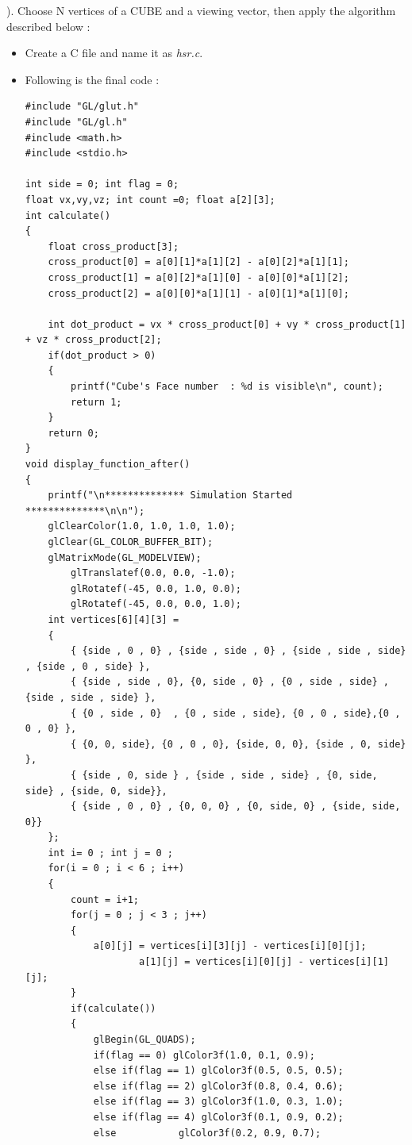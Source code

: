\vspace{0.5mm} ). Choose N vertices of a CUBE and a viewing vector, then apply the algorithm  described below :
\begin{itemize}
\item Create a C file and name it as \textit{hsr.c}.
\item Following is the final code :
\begin{lstlisting}
#include "GL/glut.h"
#include "GL/gl.h"
#include <math.h>
#include <stdio.h>

int side = 0; int flag = 0;
float vx,vy,vz; int count =0; float a[2][3];
int calculate()
{
	float cross_product[3];
	cross_product[0] = a[0][1]*a[1][2] - a[0][2]*a[1][1];
	cross_product[1] = a[0][2]*a[1][0] - a[0][0]*a[1][2];
	cross_product[2] = a[0][0]*a[1][1] - a[0][1]*a[1][0];

	int dot_product = vx * cross_product[0] + vy * cross_product[1] + vz * cross_product[2];
	if(dot_product > 0)
	{
		printf("Cube's Face number  : %d is visible\n", count);
		return 1;
	}
	return 0;
}
void display_function_after()
{
	printf("\n************** Simulation Started **************\n\n");
	glClearColor(1.0, 1.0, 1.0, 1.0);
	glClear(GL_COLOR_BUFFER_BIT);
	glMatrixMode(GL_MODELVIEW);
    	glTranslatef(0.0, 0.0, -1.0);
    	glRotatef(-45, 0.0, 1.0, 0.0);
    	glRotatef(-45, 0.0, 0.0, 1.0);
	int vertices[6][4][3] =
	{
		{ {side , 0 , 0} , {side , side , 0} , {side , side , side} , {side , 0 , side} },
		{ {side , side , 0}, {0, side , 0} , {0 , side , side} , {side , side , side} },
		{ {0 , side , 0}  , {0 , side , side}, {0 , 0 , side},{0 , 0 , 0} },
		{ {0, 0, side}, {0 , 0 , 0}, {side, 0, 0}, {side , 0, side} },
		{ {side , 0, side } , {side , side , side} , {0, side, side} , {side, 0, side}},
		{ {side , 0 , 0} , {0, 0, 0} , {0, side, 0} , {side, side, 0}}
	};
	int i= 0 ; int j = 0 ;
	for(i = 0 ; i < 6 ; i++)
	{
		count = i+1;
		for(j = 0 ; j < 3 ; j++)
		{
			a[0][j] = vertices[i][3][j] - vertices[i][0][j];
            		a[1][j] = vertices[i][0][j] - vertices[i][1][j];
		}
		if(calculate())
		{
			glBegin(GL_QUADS);
			if(flag == 0) glColor3f(1.0, 0.1, 0.9);
			else if(flag == 1) glColor3f(0.5, 0.5, 0.5);
			else if(flag == 2) glColor3f(0.8, 0.4, 0.6);
			else if(flag == 3) glColor3f(1.0, 0.3, 1.0);
			else if(flag == 4) glColor3f(0.1, 0.9, 0.2);
			else 		   glColor3f(0.2, 0.9, 0.7);


\end{lstlisting}
\end{itemize}
